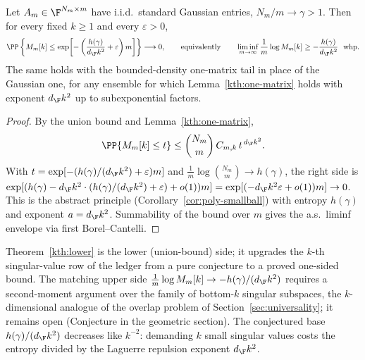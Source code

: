 \begin{theorem}\label{kth:lower}
Let $A_m\in\F^{N_m\times m}$ have i.i.d.\ standard Gaussian entries, $N_m/m\to\gamma>1$.
Then for every fixed $k\ge1$ and every $\varepsilon>0$,
\[
  \PP\left\{M_m[k]\le \exp\!\left[-\left(\frac{h(\gamma)}{d_\F k^2}+\varepsilon\right)m\right]\right\}
  \longrightarrow 0,
  \qquad\text{equivalently}\qquad
  \liminf_{m\to\infty}\frac1m\log M_m[k]\ge-\frac{h(\gamma)}{d_\F k^2}\ \ \text{whp.}
\]
The same holds with the bounded-density one-matrix tail in place of the Gaussian one,
for any ensemble for which Lemma~\ref{kth:one-matrix} holds with exponent $d_\F k^2$
up to subexponential factors.
\end{theorem}

\begin{proof}
By the union bound and Lemma~\ref{kth:one-matrix},
\[
  \PP\{M_m[k]\le t\}\le \binom{N_m}{m}\,C_{m,k}\,t^{\,d_\F k^2}.
\]
With $t=\exp[-(h(\gamma)/(d_\F k^2)+\varepsilon)m]$ and
$\tfrac1m\log\binom{N_m}{m}\to h(\gamma)$, the right side is
$\exp[(h(\gamma)-d_\F k^2\cdot(h(\gamma)/(d_\F k^2)+\varepsilon)+o(1))m]
=\exp[(-d_\F k^2\varepsilon+o(1))m]\to0$.  This is the abstract principle
(Corollary~\ref{cor:poly-smallball}) with entropy $h(\gamma)$ and exponent
$a=d_\F k^2$.  Summability of the bound over $m$ gives the a.s.\ liminf envelope via
first Borel--Cantelli.
\end{proof}

\begin{remark}[Status]
Theorem~\ref{kth:lower} is the lower (union-bound) side; it upgrades the $k$-th
singular-value row of the ledger from a pure conjecture to a proved one-sided bound.
The matching upper side $\tfrac1m\log M_m[k]\to-h(\gamma)/(d_\F k^2)$ requires a
second-moment argument over the family of bottom-$k$ singular subspaces, the
$k$-dimensional analogue of the overlap problem of Section~\ref{sec:universality}; it
remains open (Conjecture in the geometric section).  The conjectured base
$h(\gamma)/(d_\F k^2)$ decreases like $k^{-2}$: demanding $k$ small singular values
costs the entropy divided by the Laguerre repulsion exponent $d_\F k^2$.
\end{remark}
